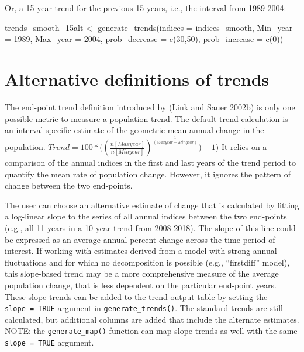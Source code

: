 \documentclass[
]{book}
\newenvironment{Shaded}{\begin{snugshade}}{\end{snugshade}}
\newcommand{\AttributeTok}[1]{\textcolor[rgb]{0.77,0.63,0.00}{#1}}
\newcommand{\DecValTok}[1]{\textcolor[rgb]{0.00,0.00,0.81}{#1}}
\newcommand{\FunctionTok}[1]{\textcolor[rgb]{0.00,0.00,0.00}{#1}}
\newcommand{\NormalTok}[1]{#1}
\newcommand{\OtherTok}[1]{\textcolor[rgb]{0.56,0.35,0.01}{#1}}
\begin{document}
Or, a 15-year trend for the previous 15 years, i.e., the interval from 1989-2004:

\begin{Shaded}
\begin{Highlighting}[]
\NormalTok{trends\_smooth\_15alt }\OtherTok{\textless{}{-}} \FunctionTok{generate\_trends}\NormalTok{(}\AttributeTok{indices =}\NormalTok{ indices\_smooth,}
                          \AttributeTok{Min\_year =} \DecValTok{1989}\NormalTok{,}
                          \AttributeTok{Max\_year =} \DecValTok{2004}\NormalTok{,}
                          \AttributeTok{prob\_decrease =} \FunctionTok{c}\NormalTok{(}\DecValTok{30}\NormalTok{,}\DecValTok{50}\NormalTok{),}
                          \AttributeTok{prob\_increase =} \FunctionTok{c}\NormalTok{(}\DecValTok{0}\NormalTok{))}
\end{Highlighting}
\end{Shaded}

\hypertarget{alternative-definitions-of-trends}{%
\section{Alternative definitions of trends}\label{alternative-definitions-of-trends}}

The end-point trend definition introduced by (\protect\hyperlink{ref-link2002a}{Link and Sauer 2002b}) is only one possible metric to measure a population trend. The default trend calculation is an interval-specific estimate of the geometric mean annual change in the population. \(Trend = 100*((\frac {n[Maxyear]}{n[Minyear]})^\frac {1}{(Maxyear-Minyear)}{)-1)}\) It relies on a comparison of the annual indices in the first and last years of the trend period to quantify the mean rate of population change. However, it ignores the pattern of change between the two end-points.

The user can choose an alternative estimate of change that is calculated by fitting a log-linear slope to the series of all annual indices between the two end-points (e.g., all 11 years in a 10-year trend from 2008-2018). The slope of this line could be expressed as an average annual percent change across the time-period of interest. If working with estimates derived from a model with strong annual fluctuations and for which no decomposition is possible (e.g., ``firstdiff'' model), this slope-based trend may be a more comprehensive measure of the average population change, that is less dependent on the particular end-point years. These slope trends can be added to the trend output table by setting the \texttt{slope\ =\ TRUE} argument in \texttt{generate\_trends()}. The standard trends are still calculated, but additional columns are added that include the alternate estimates. NOTE: the \texttt{generate\_map()} function can map slope trends as well with the same \texttt{slope\ =\ TRUE} argument.
\end{document}

